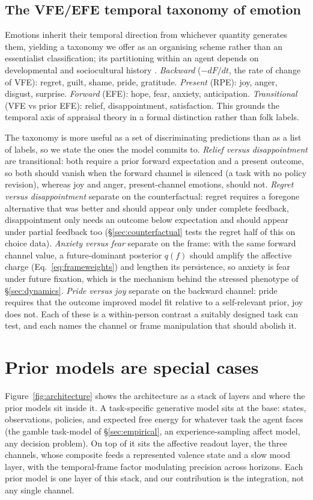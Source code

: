 \documentclass[11pt,a4paper]{article}
\begin{document}
\subsection{The VFE/EFE temporal taxonomy of emotion}
Emotions inherit their temporal direction from whichever quantity generates them,
yielding a taxonomy we offer as an organising scheme rather than an essentialist
classification; its partitioning within an agent depends on developmental and
sociocultural history \citep{barrett2017theory}.
\emph{Backward} ($-dF/dt$, the rate of change of VFE): regret, guilt, shame, pride, gratitude.
\emph{Present} (RPE): joy, anger, disgust, surprise.
\emph{Forward} (EFE): hope, fear, anxiety, anticipation.
\emph{Transitional} (VFE vs prior EFE): relief, disappointment, satisfaction.
This grounds the temporal axis of appraisal theory
\citep{smith1985patterns,ortony1988cognitive} in a formal distinction rather than
folk labels.

The taxonomy is more useful as a set of discriminating predictions than as a list of
labels, so we state the ones the model commits to. \emph{Relief versus
disappointment} are transitional: both require a prior forward expectation and a
present outcome, so both should vanish when the forward channel is silenced (a task
with no policy revision), whereas joy and anger, present-channel emotions, should
not. \emph{Regret versus disappointment} separate on the counterfactual: regret
requires a foregone alternative that was better and should appear only under complete
feedback, disappointment only needs an outcome below expectation and should appear
under partial feedback too (\S\ref{sec:counterfactual} tests the regret half of this
on choice data). \emph{Anxiety versus fear} separate on the frame: with the same
forward channel value, a future-dominant posterior $q(f)$ should amplify the
affective charge (Eq.~\ref{eq:frameweights}) and lengthen its persistence, so
anxiety is fear under future fixation, which is the mechanism behind the stressed
phenotype of \S\ref{sec:dynamics}. \emph{Pride versus joy} separate on the backward
channel: pride requires that the outcome improved model fit relative to a
self-relevant prior, joy does not. Each of these is a within-person contrast a
suitably designed task can test, and each names the channel or frame manipulation that
should abolish it.

\section{Prior models are special cases}\label{sec:predecessors}
Figure~\ref{fig:architecture} shows the architecture as a stack of layers and where
the prior models sit inside it. A task-specific generative model sits at the base:
states, observations, policies, and expected free energy for whatever task the agent
faces (the gamble task-model of \S\ref{sec:empirical}, an experience-sampling affect
model, any decision problem). On top of it sits the affective readout layer, the three
channels, whose composite feeds a represented valence state and a slow mood layer,
with the temporal-frame factor modulating precision across horizons. Each prior model
is one layer of this stack, and our contribution is the integration, not any single
channel.
\end{document}
